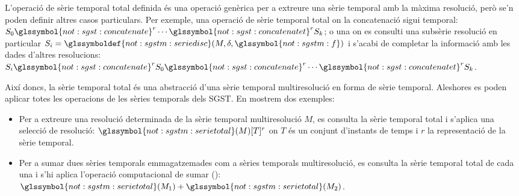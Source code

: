 L'operació de sèrie temporal total definida és una operació genèrica
per a extreure una sèrie temporal amb la màxima resolució, però se'n
poden definir altres casos particulars. Per exemple, una operació de
sèrie temporal total on la concatenació sigui temporal: $S_{0}
\glssymbol{not:sgst:concatenate}^r \dotsb
\glssymbol{not:sgst:concatenatet}^r S_{k}$; o una on es consulti una
subsèrie resolució en particular
$S_{i}=\glssymboldef{not:sgstm:seriedisc}(M,\delta,\glssymbol{not:sgstm:f})$
i s'acabi de completar la informació amb les dades d'altres
resolucions: $S_{i} \glssymbol{not:sgst:concatenate}^r S_{0}
\glssymbol{not:sgst:concatenate}^r \dotsb
\glssymbol{not:sgst:concatenatet}^r S_{k}$.


Així doncs, la sèrie temporal total és una abstracció d'una sèrie
temporal multiresolució en forma de sèrie temporal. Aleshores es poden
aplicar totes les operacions de les sèries temporals dels
\gls{SGST}. En mostrem dos exemples:
\begin{itemize}
\item Per a extreure una resolució determinada de la sèrie temporal
  multiresolució $M$, es consulta la sèrie temporal total i s'aplica
  una selecció de resolució:
  $\glssymbol{not:sgstm:serietotal}(M)[T]^r$ on $T$ és un conjunt
  d'instants de temps i $r$ la representació de la sèrie temporal.

\item Per a sumar dues sèries temporals emmagatzemades com a sèries
  temporals multiresolució, es consulta la sèrie
  temporal total de cada una i s'hi aplica l'operació computacional de
  sumar ():
  $\glssymbol{not:sgstm:serietotal}(M_1)+\glssymbol{not:sgstm:serietotal}(M_2)$.

\end{itemize}






